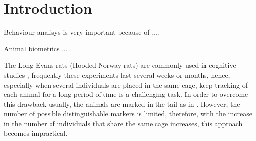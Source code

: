\documentclass[conference]{IEEEtran}
\begin{document}
\section{Introduction}



Behaviour analisys is very important because of \cite{weissbrod2013automated}.... 

Animal biometrics \cite{kuhl2013animal} ...

The Long-Evans rats (Hooded Norway rats) are commonly used in cognitive studies \cite{lambert2016natural,guarraci2016exposure,turner2014comprehensive}, frequently these experiments last several weeks or months, hence, especially when several individuals are placed in the same cage, keep tracking of each animal for a long period of time is a challenging task. In order to overcome this drawback usually, the animals are marked in the tail as in \cite{lambert2016natural}. However, the number of possible distinguishable markers is limited, therefore, with the increase in the number of individuals that share the same cage increases, this approach becomes impractical. 





\end{document}
